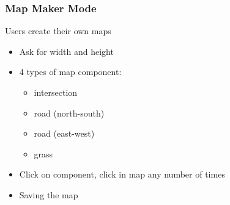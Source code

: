 \documentclass{beamer}
\begin{document}
\begin{frame}
\frametitle {Map Maker Mode}
Users create their own maps
\begin{figure}
\end{figure}
\begin{itemize}
\item Ask for width and height
\item 4 types of map component:
\begin{itemize}
\item intersection
\item road (north-south)
\item road (east-west)
\item grass
\end{itemize}
\item Click on component, click in map any number of times
\item Saving the map
\end{itemize}
\end{frame}
\end{document}

